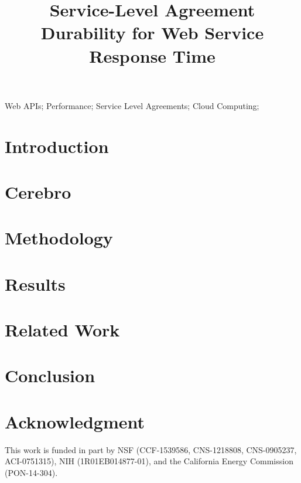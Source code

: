 \documentclass[10pt, conference, compsocconf]{IEEEtran}
\begin{document}
%
\title{Service-Level Agreement Durability for Web Service Response Time}

\author{
}

\maketitle


\begin{abstract}

\end{abstract}

\begin{IEEEkeywords}
Web APIs; Performance; Service Level Agreements;
Cloud Computing;
\end{IEEEkeywords}

\section{Introduction}
\label{sec:intro}


\section{Cerebro}
\label{sec:cerebro}


\section{Methodology}
\label{sec:methodology}


\section{Results}
\label{sec:results}


\section{Related Work}
\label{sec:related_work}


\section{Conclusion}


\section*{Acknowledgment}
This work is funded in part by NSF (CCF-1539586, CNS-1218808, CNS-0905237, ACI-0751315), NIH (1R01EB014877-01), and the California Energy Commission (PON-14-304).


%

\end{document}
